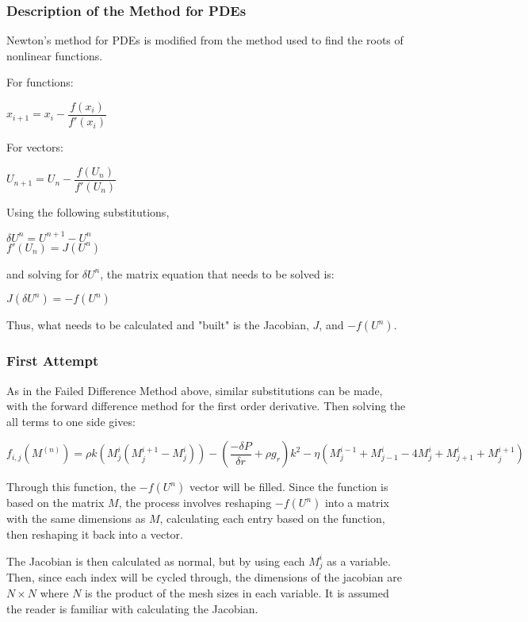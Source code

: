 \documentclass{article}
\begin{document}
	\subsubsection{Description of the Method for PDEs}
	Newton's method for PDEs is modified from the method used to find the roots of nonlinear functions.
	\begin{center}
		For functions:
		
		$x_{i+1}=x_{i}-\dfrac{f(x_{i})}{f'(x_{i})}$
		
		For vectors:
		
		 $U_{n+1}=U_{n}-\dfrac{f(U_{n})}{f'(U_{n})}$
		 
	\end{center}

Using the following substitutions, 
\begin{center}
	 $\delta U^{n}=U^{n+1}-U^{n}$\\
	$f'(U_{n})=J(U^{n})$
\end{center}
and solving for $\delta U^{n}$, the matrix equation that needs to be solved is:
\begin{center}
 $J(\delta U^{n})=-f(U^{n})$
\end{center}
Thus, what needs to be calculated and "built" is the Jacobian, $J$, and $-f(U^{n})$.
\subsubsection{First Attempt}
As in the Failed Difference Method above, similar substitutions can be made, with the forward difference method for the first order derivative. Then solving the all terms to one side gives:
\begin{center}
	$f_{i,j}(M^{(n)})=\rho k (M^{i}_{j}(M^{i+1}_{j}-M^{i}_{j}))-(\dfrac{-\delta P}{\delta r}+\rho g_r)k^{2}-\eta(M^{i-1}_{j}+M^{i}_{j-1}-4M^{i}_{j}+M^{i}_{j+1}+M^{i+1}_{j})$
\end{center}
Through this function, the $-f(U^{n})$ vector will be filled. Since the function is based on the matrix $M$, the process involves reshaping $-f(U^{n})$ into a matrix with the same dimensions as $M$, calculating each entry based on the function, then reshaping it back into a vector.

The Jacobian is then calculated as normal, but by using each $M^{i}_{j}$ as a variable. Then, since each index will be cycled through, the dimensions of the jacobian are $N \times N$ where $N$ is the product of the mesh sizes in each variable. It is assumed the reader is familiar with calculating the Jacobian.
\end{document}
